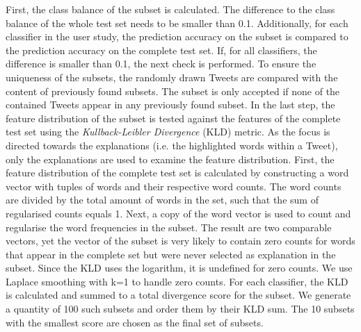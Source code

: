 First, the class balance of the subset is calculated. The difference to the class balance of the whole test set needs to be smaller than 0.1.\newline
Additionally, for each classifier in the user study, the prediction accuracy on the subset is compared to the prediction accuracy on the complete test set. If, for all classifiers, the difference is smaller than 0.1, the next check is performed.\newline
To ensure the uniqueness of the subsets, the randomly drawn Tweets are compared with the content of previously found subsets. The subset is only accepted if none of the contained Tweets appear in any previously found subset.\newline
In the last step, the feature distribution of the subset is tested against the features of the complete test set using the \textit{Kullback-Leibler Divergence} (KLD) metric. As the focus is directed towards the explanations (i.e. the highlighted words within a Tweet), only the explanations are used to examine the feature distribution. First, the feature distribution of the complete test set is calculated by constructing a word vector with tuples of words and their respective word counts. The word counts are divided by the total amount of words in the set, such that the sum of regularised counts equals 1. Next, a copy of the word vector is used to count and regularise the word frequencies in the subset. The result are two comparable vectors, yet the vector of the subset is very likely to contain zero counts for words that appear in the complete set but were never selected as explanation in the subset. Since the KLD uses the logarithm, it is undefined for zero counts. We use Laplace smoothing with k=1 to handle zero counts. For each classifier, the KLD is calculated and summed to a total divergence score for the subset.\newline
We generate a quantity of 100 such subsets and order them by their KLD sum. The 10 subsets with the smallest score are chosen as the final set of subsets.\newline




